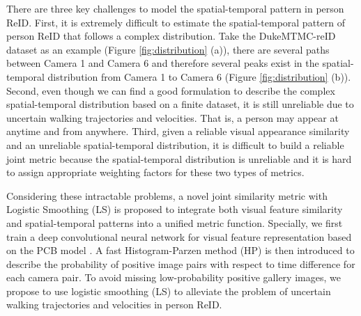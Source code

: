 \documentclass[letterpaper]{article} %
\begin{document}
There are three key challenges to model the spatial-temporal pattern in person ReID. First, it is extremely difficult to estimate the spatial-temporal pattern of person ReID that follows a complex distribution. Take the  DukeMTMC-reID dataset as an example (Figure \ref{fig:distribution} (a)), there are several paths between Camera 1 and Camera 6 and therefore several peaks exist in the spatial-temporal distribution from Camera 1 to Camera 6 (Figure \ref{fig:distribution} (b)). Second, even though we can find a good formulation to describe the complex spatial-temporal distribution based on a finite dataset, it is still unreliable due to uncertain walking trajectories and velocities. That is, a person may appear at anytime and from anywhere. Third, given a reliable visual appearance similarity and an unreliable spatial-temporal distribution, it is difficult to build a reliable joint metric because the spatial-temporal distribution is unreliable and it is hard to assign appropriate weighting factors for these two types of metrics.

Considering these intractable problems, a novel joint similarity metric with Logistic Smoothing (LS) is proposed to integrate both visual feature similarity and spatial-temporal patterns into a unified metric function. Specially, we first train a deep convolutional neural network for visual feature representation based on the PCB model \cite{Yifan2017arxiv}. A fast Histogram-Parzen method (HP) is then introduced to describe the probability of positive image pairs with respect to time difference for each camera pair. To avoid missing low-probability positive gallery images, we propose to use logistic smoothing (LS) to alleviate the problem of uncertain walking trajectories and velocities in person ReID.
\end{document}
